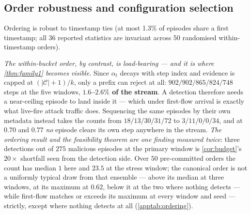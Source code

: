 \documentclass[conference]{IEEEtran}
\newcommand{\Cal}{\mathcal{C}}
\newcommand{\nCal}{\lvert\Cal\rvert}
\newcommand{\alphat}{\alpha_t}
\begin{document}
\subsection{Order robustness and configuration selection}\label{sec:transfer}

Ordering is robust to timestamp ties (at most 1.3\% of episodes share a first timestamp; all 36
reported statistics are invariant across 50 randomised within-timestamp orders).

\emph{The within-bucket order, by contrast, is load-bearing --- and it is where \cref{thm:family1}
becomes visible.} Since $\alphat$ decays with step index and evidence is capped at $(\nCal{+}1)/k$,
only a prefix can reject at all: $902/902/865/824/748$ steps at the five windows, \textbf{$1.6$--$2.6\%$
of the stream}. A detection therefore needs a near-ceiling episode to land inside it --- which under
first-flow arrival is exactly what live-fire attack traffic does. Sequencing the same episodes by their
own metadata instead takes the counts from $18/13/30/31/72$ to $3/11/0/0/34$, and at $0.70$ and $0.77$
\emph{no} episode clears its own step anywhere in the stream. \emph{The ordering result and the
feasibility theorem are one finding measured twice}: three detections out of $275$ malicious episodes
at the primary window is \cref{cor:budget}'s $20\times$ shortfall seen from the detection side. Over
$50$ pre-committed orders the count has median $1$ here and $23.5$ at the stress window; the canonical
order is not a uniformly typical draw from that ensemble --- above its median at three windows, at its
maximum at $0.62$, below it at the two where nothing detects --- while first-flow matches or exceeds its maximum at
every window and seed --- strictly, except where nothing detects at all
(\cref{apptab:ordering}).
\end{document}
